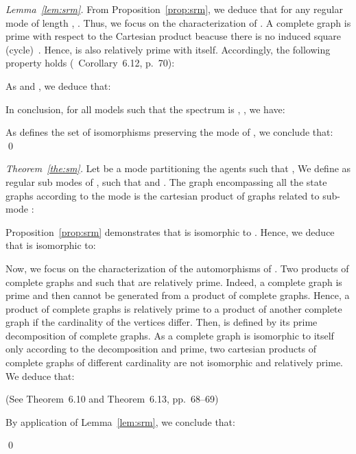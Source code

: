 \documentclass[12pt]{elsarticle}
\begin{document}
\begin{proof}[Lemma~\ref{lem:srm}]
From Proposition~\ref{prop:srm}, we deduce that for any regular mode  of length , .
Thus, we focus on the characterization of . A complete graph is prime with respect to the Cartesian product beacuse there is no induced square (cycle)~\cite{Imrich2008}. Hence,  is also relatively prime with itself. Accordingly, the following property holds (\cite{Hammack2011}~Corollary~6.12, p.~70): 
  
As  and , we deduce that: 

In conclusion, for all models  such that the spectrum is , , we have:
 
 As  defines the set of isomorphisms preserving the mode of , we conclude that: 
\qed \end{proof}

\begin{proof}[Theorem~\ref{the:sm}]

Let  be a mode partitioning the agents such that , We define  as regular sub modes of , such that  and . 
The graph encompassing all the state graphs according to the mode  is the cartesian product of graphs related to sub-mode :


\medskip 
\noindent
Proposition~\ref{prop:srm} demonstrates that  is isomorphic to . Hence, we deduce that  is isomorphic to:
  

\medskip
\noindent
Now, we focus on the characterization of the automorphisms of .
Two products of complete graphs  and  such that  are relatively prime. Indeed, a complete graph is prime and then cannot be generated from a product of complete graphs. Hence, a product of complete graphs is relatively prime to a product of another complete graph if the cardinality of the vertices differ. Then,  is defined by its prime decomposition of complete graphs. As a complete graph  is isomorphic to itself only according to the decomposition and prime, two cartesian products of complete graphs of different cardinality are not isomorphic and relatively prime. We deduce that: 

(See \cite{Hammack2011} Theorem~6.10 and Theorem~6.13, pp.~68--69)
 
\medskip
\noindent
By application of Lemma~\ref{lem:srm}, we conclude that:

\qed \end{proof}
\end{document}
